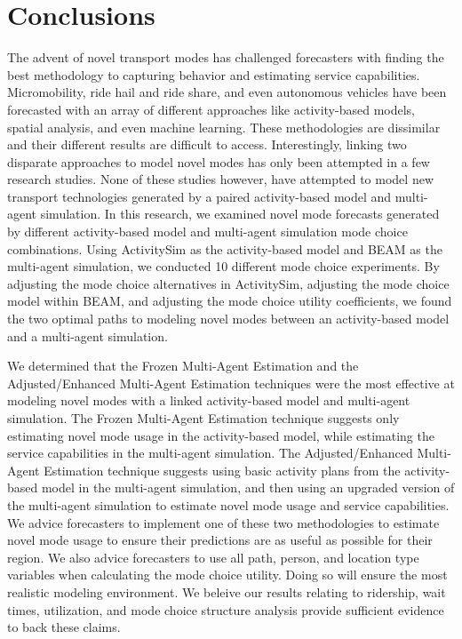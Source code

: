 \documentclass[12pt, oneside, openright]{byuthesis}
\begin{document}
\hypertarget{conclusions}{%
\chapter{Conclusions}\label{conclusions}}

The advent of novel transport modes has challenged forecasters with finding the best methodology to capturing behavior and estimating service capabilities. Micromobility, ride hail and ride share, and even autonomous vehicles have been forecasted with an array of different approaches like activity-based models, spatial analysis, and even machine learning. These methodologies are dissimilar and their different results are difficult to access. Interestingly, linking two disparate approaches to model novel modes has only been attempted in a few research studies. None of these studies however, have attempted to model new transport technologies generated by a paired activity-based model and multi-agent simulation. In this research, we examined novel mode forecasts generated by different activity-based model and multi-agent simulation mode choice combinations. Using ActivitySim as the activity-based model and BEAM as the multi-agent simulation, we conducted 10 different mode choice experiments. By adjusting the mode choice alternatives in ActivitySim, adjusting the mode choice model within BEAM, and adjusting the mode choice utility coefficients, we found the two optimal paths to modeling novel modes between an activity-based model and a multi-agent simulation.

We determined that the Frozen Multi-Agent Estimation and the Adjusted/Enhanced Multi-Agent Estimation techniques were the most effective at modeling novel modes with a linked activity-based model and multi-agent simulation. The Frozen Multi-Agent Estimation technique suggests only estimating novel mode usage in the activity-based model, while estimating the service capabilities in the multi-agent simulation. The Adjusted/Enhanced Multi-Agent Estimation technique suggests using basic activity plans from the activity-based model in the multi-agent simulation, and then using an upgraded version of the multi-agent simulation to estimate novel mode usage and service capabilities. We advice forecasters to implement one of these two methodologies to estimate novel mode usage to ensure their predictions are as useful as possible for their region. We also advice forecasters to use all path, person, and location type variables when calculating the mode choice utility. Doing so will ensure the most realistic modeling environment. We beleive our results relating to ridership, wait times, utilization, and mode choice structure analysis provide sufficient evidence to back these claims.
\end{document}
